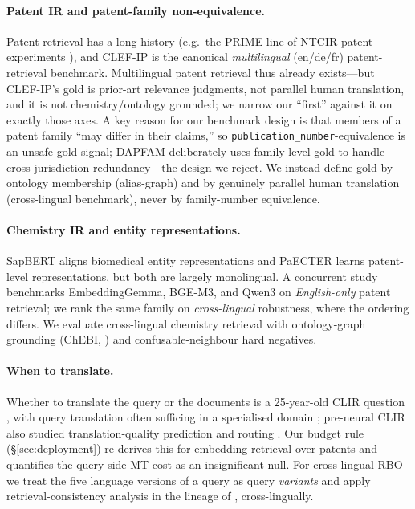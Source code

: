 \documentclass[11pt]{article}
\begin{document}
\paragraph{Patent IR and patent-family non-equivalence.}
Patent retrieval has a long history (e.g.\ the PRIME line of NTCIR patent
experiments \citep{prime2002}), and CLEF-IP \citep{clefip2013} is the canonical
\emph{multilingual} (en/de/fr) patent-retrieval benchmark. Multilingual patent
retrieval thus already exists---but CLEF-IP's gold is prior-art relevance
judgments, not parallel human translation, and it is not chemistry/ontology
grounded; we narrow our ``first'' against it on exactly those axes. A key reason
for our benchmark design is that members of a patent family ``may differ in
their claims,'' so \texttt{publication\_number}-equivalence is an unsafe gold
signal; DAPFAM \citep{dapfam2025} deliberately uses family-level gold to handle
cross-jurisdiction redundancy---the design we reject. We instead define gold by
ontology membership (alias-graph) and by genuinely parallel human translation
(cross-lingual benchmark), never by family-number equivalence.

\paragraph{Chemistry IR and entity representations.}
SapBERT \citep{sapbert2021} aligns biomedical entity representations and PaECTER
\citep{paecter2024} learns patent-level representations, but both are largely
monolingual. A concurrent study \citep{patentembeddings2026} benchmarks
EmbeddingGemma, BGE-M3, and Qwen3 on \emph{English-only} patent retrieval; we
rank the same family on \emph{cross-lingual} robustness, where the ordering
differs. We evaluate cross-lingual chemistry retrieval with ontology-graph
grounding (ChEBI, \citealp{chebi2016}) and confusable-neighbour hard negatives.

\paragraph{When to translate.}
Whether to translate the query or the documents is a 25-year-old CLIR question
\citep{oard1998,salehpecina2020}, with query translation often sufficing in a
specialised domain \citep{salehpecina2020}; pre-neural CLIR also studied
translation-quality prediction and routing \citep{kishida2008}. Our budget rule
(\S\ref{sec:deployment}) re-derives this for embedding retrieval over patents
and quantifies the query-side MT cost as an insignificant null. For
cross-lingual RBO we treat the five language versions of a query as query
\emph{variants} and apply retrieval-consistency analysis in the lineage of
\citet{bailey2017consistency}, cross-lingually.
\end{document}

